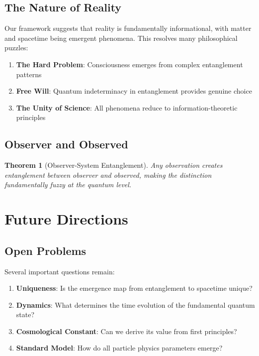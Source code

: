 \documentclass[12pt,a4paper]{article}
\theoremstyle{plain}
\newtheorem{theorem}{Theorem}[section]
\theoremstyle{definition}
\theoremstyle{remark}
\begin{document}
\subsection{The Nature of Reality}

Our framework suggests that reality is fundamentally informational, with matter and spacetime being emergent phenomena. This resolves many philosophical puzzles:

\begin{enumerate}
\item \textbf{The Hard Problem}: Consciousness emerges from complex entanglement patterns
\item \textbf{Free Will}: Quantum indeterminacy in entanglement provides genuine choice
\item \textbf{The Unity of Science}: All phenomena reduce to information-theoretic principles
\end{enumerate}

\subsection{Observer and Observed}

\begin{theorem}[Observer-System Entanglement]
Any observation creates entanglement between observer and observed, making the distinction fundamentally fuzzy at the quantum level.
\end{theorem}

\section{Future Directions}

\subsection{Open Problems}

Several important questions remain:

\begin{enumerate}
\item \textbf{Uniqueness}: Is the emergence map from entanglement to spacetime unique?
\item \textbf{Dynamics}: What determines the time evolution of the fundamental quantum state?
\item \textbf{Cosmological Constant}: Can we derive its value from first principles?
\item \textbf{Standard Model}: How do all particle physics parameters emerge?
\end{enumerate}
\end{document}
